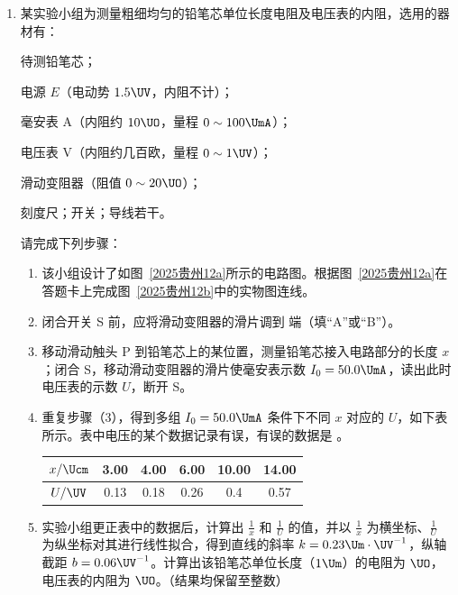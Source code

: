 \documentclass[\gkver]{gaokaozhenti}
\begin{document}
\begin{enumerate}
{竖直方向根据 $\Delta y' = gT^{2}$，结合逐差法可得

$g = \frac{(\Delta y_{4} + \Delta y_{3}) - (\Delta y_{2} + \Delta y_{1})}{4T^{2}} = \frac{(0.1704 + 0.1465) - (0.1217 + 0.0975)}{4 \times 0.05^{2}} \Umsq = 9.77 \Umsq$
}

\item
某实验小组为测量粗细均匀的铅笔芯单位长度电阻及电压表的内阻，选用的器材有：

待测铅笔芯；

电源 $E$（电动势 $1.5 \UV$，内阻不计）；

毫安表 A（内阻约 $10 \UO$，量程 $0 \sim 100 \UmA$）；

电压表 V（内阻约几百欧，量程 $0 \sim 1 \UV$）；

滑动变阻器（阻值 $0 \sim 20 \UO$）；

刻度尺；开关；导线若干。

请完成下列步骤：

\begin{enumerate}
\item
该小组设计了如图~\ref{2025贵州12a}所示的电路图。根据图~\ref{2025贵州12a}在答题卡上完成图~\ref{2025贵州12b}中的实物图连线。

\item
闭合开关 S 前，应将滑动变阻器的滑片调到  端（填“A”或“B”）。

\item
移动滑动触头 P 到铅笔芯上的某位置，测量铅笔芯接入电路部分的长度 $x$；闭合 S，移动滑动变阻器的滑片使毫安表示数 $I_{0} = 50.0 \UmA$，读出此时电压表的示数 $U$，断开 S。

\item
重复步骤（3），得到多组 $I_{0} = 50.0 \UmA$ 条件下不同 $x$ 对应的 $U$，如下表所示。表中电压的某个数据记录有误，有误的数据是 。

\begin{center}
\begin{tabular}{|c|c|c|c|c|c|}
\hline
$x/\Ucm$ & 3.00 & 4.00 & 6.00 & 10.00 & 14.00 \\
\hline
$U/\UV$ & 0.13 & 0.18 & 0.26 & 0.4 & 0.57 \\
\hline
\end{tabular}
\end{center}

\item
实验小组更正表中的数据后，计算出 $\frac{1}{x}$ 和 $\frac{1}{U}$ 的值，并以 $\frac{1}{x}$ 为横坐标、$\frac{1}{U}$ 为纵坐标对其进行线性拟合，得到直线的斜率 $k = 0.23 \Um\cdot\UV^{-1}$，纵轴截距 $b = 0.06 \UV^{-1}$。计算出该铅笔芯单位长度（$1 \Um$）的电阻为  $\UO$，电压表的内阻为  $\UO$。（结果均保留至整数）
\end{enumerate}


\end{enumerate}
\end{document}
